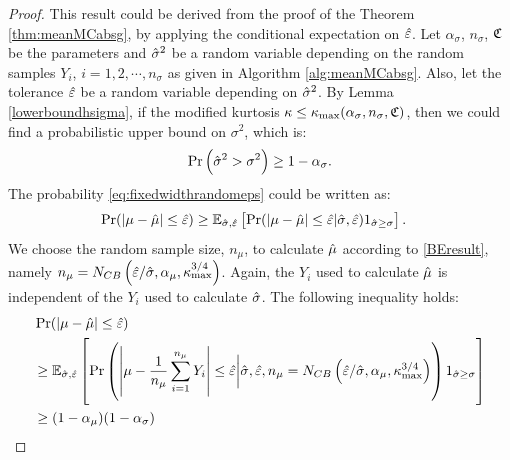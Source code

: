 \documentclass{iitthesis}
\theoremstyle{definition}
\begin{document}
\begin{proof}
This result could be derived from the proof of the Theorem \ref{thm:meanMCabsg}, by applying the conditional expectation on $\hat{\varepsilon}$.
Let $\alpha_\sigma$, $n_\sigma$, $\mathfrak{C}$ be the parameters and $\hat{\sigma}^2$ be a random variable depending on the random samples $Y_i$, $i = 1,2,\cdots, n_{\sigma}$ as given in Algorithm \ref{alg:meanMCabsg}. Also, let the tolerance $\hat{\varepsilon}$ be a random variable depending on $\hat{\sigma}^2$. By Lemma \ref{lowerboundhsigma}, if the modified kurtosis $\kappa \leq \kappa_{\max}(\alpha_{\sigma},n_{\sigma},\mathfrak{C})$, then we could find a probabilistic upper bound on $\sigma^2$, which is:
$$\Pr \left(\hat{\sigma}^2 > \sigma^2\right)\geq 1-\alpha_{\sigma}.$$
The probability \eqref{eq:fixedwidthrandomeps} could be written as:
\begin{align}
&\Pr(\left \lvert \mu-\hat{\mu} \right \rvert \leq \hat{\varepsilon}) \geq \mathbb{E}_{\hat{\sigma},\hat{\varepsilon}}\left[\Pr({\left \lvert \mu-\hat{\mu} \right \rvert \leq \hat{\varepsilon}}| \hat{\sigma} , \hat{\varepsilon})1_{\hat{\sigma} \geq \sigma }\right].
\end{align}
We choose the random sample size, $n_\mu$, to calculate $\hat{\mu}$ according to \eqref{BEresult}, namely $n_\mu= N_{CB}\left(\hat{\varepsilon}/\hat{\sigma},\alpha_\mu, \kappa_{\max}^{3/4}\right)$. Again, the $Y_i$ used to calculate $\hat{\mu}$ is independent of the $Y_i$ used to calculate $\hat{\sigma}$.  The following inequality holds:
\begin{align*}
&\Pr(\left \lvert \mu-\hat{\mu} \right \rvert \leq \hat{\varepsilon})\\
&\geq \mathbb{E}_{\hat{\sigma},\hat{\varepsilon}}\left[\Pr\left({\left \lvert \mu-\frac{1}{n_\mu}\sum_{i=1}^{n_\mu}Y_i \right \rvert \leq \hat{\varepsilon}}\bigg \vert \hat{\sigma} , \hat{\varepsilon}, n_\mu= N_{CB}\left(\hat{\varepsilon}/\hat{\sigma},\alpha_\mu, \kappa_{\max}^{3/4}\right)\right)1_{\hat{\sigma} \geq \sigma }\right]\\
&\geq (1-\alpha_\mu)(1-\alpha_\sigma) 
\end{align*}


\end{proof}
\end{document}
